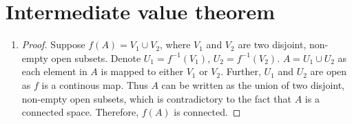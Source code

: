 \documentclass[paper=a4, fontsize=11pt]{scrartcl} %
\numberwithin{equation}{section} %
\numberwithin{figure}{section} %
\numberwithin{table}{section} %
\begin{document}
\section{Intermediate value theorem}

\begin{enumerate}
	\item
      \begin{proof}
      	Suppose $f(A) = V_1 \cup V_2$, where $V_1$ and $V_2$ are two disjoint, non-empty open subsets.
      	Denote $U_1 = f^{-1}(V_1)$, $U_2 = f^{-1}(V_2)$. $A = U_1 \cup U_2$ as each element in $A$ is mapped to either $V_1$ or $V_2$.
      	Further, $U_1$ and $U_2$ are open as $f$ is a continous map. 
      	Thus $A$ can be written as the union of two disjoint, non-empty open subsets, which is contradictory to the fact that $A$ is a connected space. Therefore, $f(A)$ is connected.
      \end{proof}
  

\end{enumerate}
\end{document}
